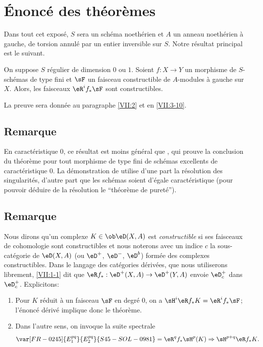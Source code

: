 \section{Énoncé des théorèmes}\label{VII:1}

Dans tout cet exposé, $S$ sera un schéma noethérien et $A$ un anneau 
noethérien à gauche, de torsion annulé par un entier inversible sur $S$. 
Notre résultat principal est le suivant. 





\begin{theorem_}\label{VII:1-1}
On suppose $S$ régulier de dimension $0$ ou $1$. Soient $f:X\to Y$ un 
morphisme de $S$-schémas de type fini et $\sF$ un faisceau constructible de 
$A$-modules à gauche sur $X$. Alors, les faisceaux $\eR^i f_\ast \sF$ sont 
constructibles. 
\end{theorem_}

La preuve sera donnée au paragraphe \ref{VII:2} et en \ref{VII:3-10}. 





\subsection{Remarque}\label{VII:1-2}

En caractéristique $0$, ce résultat est moins général que 
, qui prouve la conclusion du théorème pour 
tout morphisme de type fini de schémas excellents de caractéristique $0$. 
La démonstration de  utilise d'une part la résolution des  
singularités, d'autre part que les schémas soient d'égale 
caractéristique (pour pouvoir déduire de la résolution le ``théorème 
de pureté''). 






\subsection{Remarque}\label{VII:1-3}

Nous dirons qu'un complexe $K\in\ob\eD(X,A)$ est \emph{constructible} si ses 
faisceaux de cohomologie sont constructibles et nous noterons avec un indice 
$c$ la sous-catégorie de $\eD(X,A)$ (ou $\eD^+$, $\eD^-$, $\eD^b$) formée 
des complexes constructibles. Dans le langage des catégories dérivées, 
que nous utiliserons librement, \ref{VII:1-1} dit que 
$\eR f_\ast:\eD^+(X,A) \to \eD^+(Y,A)$ envoie $\eD_c^+$ dans $\eD_c^+$. 
Explicitons: 
\begin{enumerate}[\indent a)]
  \item Pour $K$ réduit à un faisceau $\sF$ en degré $0$, on a 
    $\sH^i\eR f_\ast K = \eR^i f_\ast \sF$; l'énoncé dérivé implique 
    donc le théorème. 
  \item Dans l'autre sens, on invoque la suite spectrale 
    \[
      \var[FR-0245]{E_1^{p q}}{E_2^{p q}}{S45-SOL-0981} = \eR^q f_\ast \sH^p(K) \Rightarrow \sH^{p+q} \eR f_\ast K \text{.} 
    \]
\end{enumerate}

